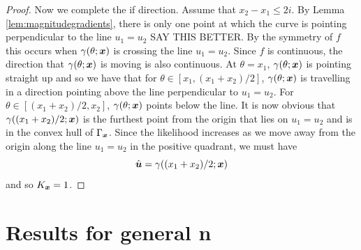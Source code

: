 \begin{proof}
			Now we complete the if direction. Assume that $x_2 - x_1 \leq 2i$. By Lemma \ref{lem:magnitudegradients}, there is only one point at which the curve is pointing perpendicular to the line $u_1 = u_2$ SAY THIS BETTER. By the symmetry of $f$ this occurs when $\gamma(\theta;{\bm{{x}}})$ is crossing the line $u_1 = u_2$. Since $f$ is continuous, the direction that $\gamma(\theta;{\bm{{x}}})$ is moving is also continuous. At $\theta = x_1$, $\gamma(\theta;{\bm{{x}}})$ is pointing straight up and so we have that for $\theta \in [x_1,(x_1 + x_2)/2]$, $\gamma(\theta;{\bm{{x}}})$ is travelling in a direction pointing above the line perpendicular to $u_1 = u_2$. For $\theta \in [(x_1 + x_2)/2,x_2]$, $\gamma(\theta;{\bm{{x}}})$ points below the line. It is now obvious that $\gamma((x_1 + x_2)/2;{\bm{{x}}})$ is the furthest point from the origin that lies on $u_1 = u_2$ and is in the convex hull of $\Gamma_{\bm{{x}}}$. Since the likelihood increases as we move away from the origin along the line $u_1 = u_2$ in the positive quadrant, we must have
			$$\hat{{\bm{{u}}}} = \gamma((x_1 + x_2)/2;{\bm{{x}}})$$
			and so $K_{\bm{{x}}} = 1$.
			
		\end{proof}

\section{Results for general n}
	
